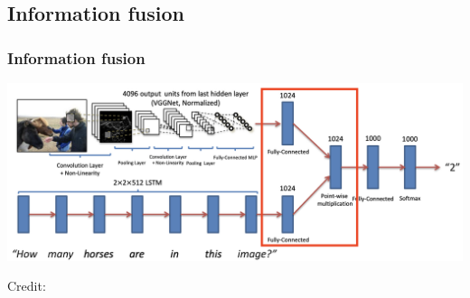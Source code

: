 \documentclass{beamer}
\begin{document}
\subsection{Information fusion}
\begin{frame}
\frametitle{Information fusion}
\begin{center}
\includegraphics[scale=0.27]{./images/InformationFusion0}
\end{center}
\begin{center}
\hspace*{12pt}\hbox{\scriptsize Credit:}
\end{center}
\end{frame}
\end{document}

